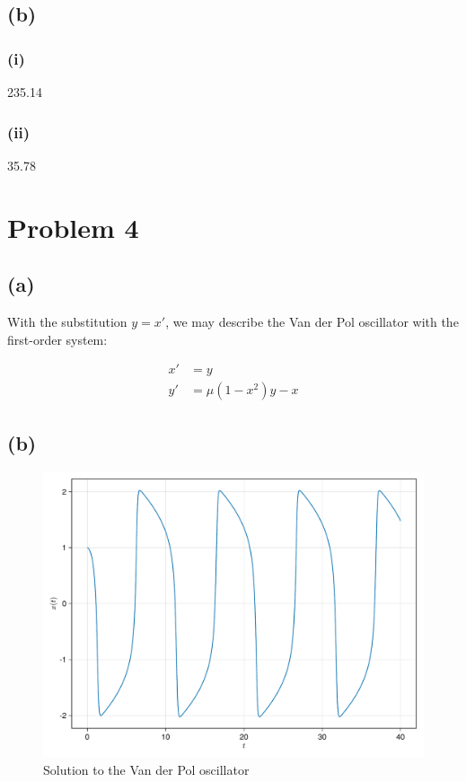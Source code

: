 \documentclass[a4paper, british]{article}
\begin{document}
\subsection*{(b)}

\subsubsection*{(i)}

235.14

\subsubsection*{(ii)}

35.78

\section{Problem 4}

\subsection*{(a)}

With the substitution \(y = x \prime\), we may describe the Van der Pol oscillator with the first-order system:

\begin{align*}
    x \prime &= y \\
    y \prime &= \mu (1 - x^2)y - x
\end{align*}

\subsection*{(b)}

\begin{figure}[H]
    \centering
    \includegraphics[width=\textwidth]{figures/f4_1.pdf}
    \caption{Solution to the Van der Pol oscillator}
    \label{fig:4_1}
\end{figure}
\end{document}
